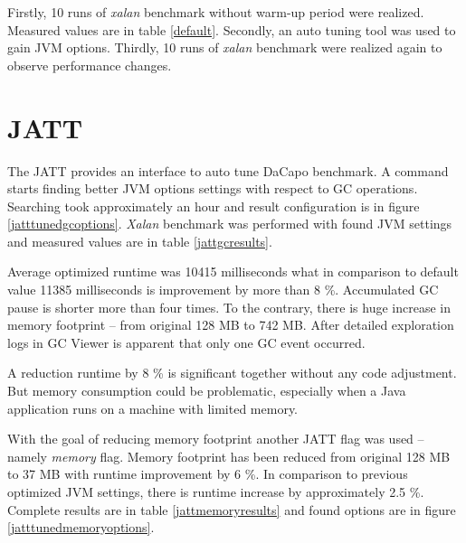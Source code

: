\documentclass[
  digital, %
  oneside,
  notable, %
  nolof,     %
  nolot     %
]{fithesis3}
\begin{document}
Firstly, 10 runs of \textit{xalan} benchmark without warm-up period were realized. Measured values are in table \ref{default}. Secondly, an auto tuning tool was used to gain JVM options. Thirdly, 10 runs of \textit{xalan} benchmark were realized again to observe performance changes.

\section{JATT}
The JATT provides an interface to auto tune DaCapo benchmark. A command \texttt{} starts finding better JVM options settings with respect to GC operations. Searching took approximately an hour and result configuration is in figure \ref{jatttunedgcoptions}. \textit{Xalan} benchmark was performed with found JVM settings and measured values are in table \ref{jattgcresults}.

Average optimized runtime was 10415 milliseconds what in comparison to default value 11385 milliseconds is improvement by more than 8 \%. Accumulated GC pause is shorter more than four times. To the contrary, there is huge increase in memory footprint -- from original 128 MB to 742 MB. After detailed exploration logs in GC Viewer is apparent that only one GC event occurred.

A reduction runtime by 8 \% is significant together without any code adjustment. But memory consumption could be problematic, especially when a Java application runs on a machine with limited memory.

With the goal of reducing memory footprint another JATT flag was used -- namely \textit{memory} flag. Memory footprint has been reduced from original 128 MB to 37 MB with runtime improvement by 6 \%. In comparison to previous optimized JVM settings, there is runtime increase by approximately 2.5 \%.  Complete results are in table \ref{jattmemoryresults} and found options are in figure \ref{jatttunedmemoryoptions}.
\end{document}
